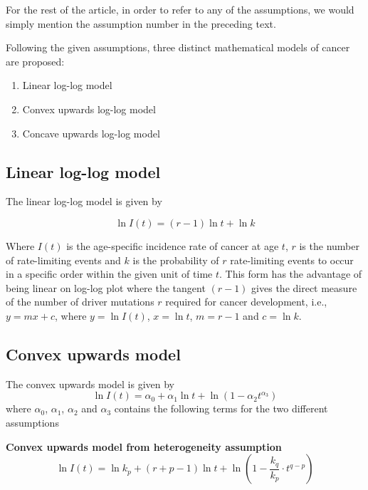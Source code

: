 \documentclass[lineno,sn-basic, Numbered]{sn-jnl}%
\theoremstyle{thmstyleone}%
\theoremstyle{thmstyletwo}%
\theoremstyle{thmstylethree}%
\begin{document}
For the rest of the article, in order to refer to any of the assumptions, we would simply mention the assumption number in the preceding text.

\vspace{1cm}

Following the given assumptions, three distinct mathematical models of cancer are proposed:

\begin{enumerate}
\item Linear log-log model
\item Convex upwards log-log model
\item Concave upwards log-log model
\end{enumerate} 

\subsection*{Linear log-log model}

The linear log-log model is given by

\begin{equation}
\ln I(t) = (r - 1) \ln t + \ln k
\end{equation}

Where \( I(t) \) is the age-specific incidence rate of cancer at age \( t \), \( r \) is the number of rate-limiting events and \( k \) is the probability of \( r \) rate-limiting events to occur in a specific order within the given unit of time \( t \).
This form has the advantage of being linear on log-log plot where the tangent \( (r - 1) \) gives the direct measure of the number of driver mutations \( r \) required for cancer development, i.e., \( y = mx + c \), where \( y = \ln I(t) \), \( x = \ln t \), \( m = r - 1 \) and \( c = \ln k \).

\subsection*{Convex upwards model}

The convex upwards model is given by
\begin{equation}
\ln I(t) = \alpha_0 + \alpha_1 \ln t + \ln(1 - \alpha_2 t^{\alpha_3})
\end{equation}
where \( \alpha_0 \), \( \alpha_1 \),  \( \alpha_2 \) and \(\alpha_3\) contains the following terms for the two different assumptions

\textbf{Convex upwards model from heterogeneity assumption}
\begin{equation}
\ln I(t) = \ln k_p + (r + p - 1) \ln t + \ln \left( 1 - \frac{k_q}{k_p} \cdot t^{q-p} \right)
\end{equation}
\end{document}

